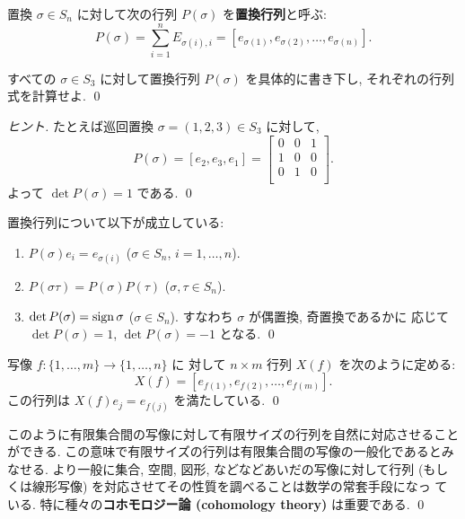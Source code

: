 \documentclass[12pt,twoside]{jarticle}
\begin{document}
置換 $\sigma\in S_n$ に対して次の行列 $P(\sigma)$ を{\bf 置換行列}と呼ぶ:
\begin{equation*}
  P(\sigma) 
  = \sum_{i=1}^n E_{\sigma(i),i}
  = [e_{\sigma(1)},e_{\sigma(2)},\ldots,e_{\sigma(n)}].
\end{equation*}

\begin{question}
  すべての $\sigma\in S_3$ に対して置換行列 $P(\sigma)$ を具体的に書き下し,
  それぞれの行列式を計算せよ.
  \qed
\end{question}

\begin{proof}[ヒント]
  たとえば巡回置換 $\sigma = (1,2,3) \in S_3$ に対して,
  \begin{equation*}
    P(\sigma) = [e_2, e_3, e_1] = 
    \begin{bmatrix}
      0 & 0 & 1 \\
      1 & 0 & 0 \\
      0 & 1 & 0 \\
    \end{bmatrix}.
  \end{equation*}
  よって $\det P(\sigma) = 1$ である.  \qed
\end{proof}

\begin{question}
  置換行列について以下が成立している:
  \begin{enumerate}
  \item $P(\sigma)e_i = e_{\sigma(i)}$ \quad ($\sigma\in S_n$, $i=1,\ldots,n$).
  \item $P(\sigma\tau) = P(\sigma)P(\tau)$ \quad ($\sigma,\tau\in S_n$).
  \item $\det P(\sigma) = \mathop{\mathrm{sign}}\nolimits\sigma$ \quad ($\sigma\in S_n$). 
    \quad すなわち $\sigma$ が偶置換, 奇置換であるかに
    応じて $\det P(\sigma) = 1$, $\det P(\sigma) = -1$ となる.
    \qed
  \end{enumerate}
\end{question}

\begin{question}
  写像 $f:\{1,\ldots,m\}\to\{1,\dots,n\}$ に
  対して $n\times m$ 行列 $X(f)$ を次のように定める:
  \begin{equation*}
    X(f) = [e_{f(1)},e_{f(2)},\ldots,e_{f(m)}].
  \end{equation*}
  この行列は $X(f)e_j = e_{f(j)}$ を満たしている.
  \qed
\end{question}

\begin{guide}
  このように有限集合間の写像に対して有限サイズの行列を自然に対応させること
  ができる.  この意味で有限サイズの行列は有限集合間の写像の一般化であるとみ
  なせる.  より一般に集合, 空間, 図形, などなどあいだの写像に対して行列 
  (もしくは線形写像) を対応させてその性質を調べることは数学の常套手段になっ
  ている.  特に種々の{\bf コホモロジー論 (cohomology theory)} は重要である.
  \qed
\end{guide}
\end{document}
